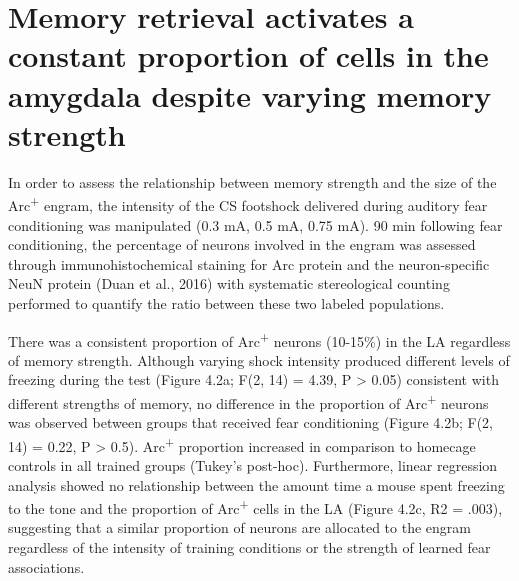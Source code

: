 \documentclass[12pt,a4paper,]{report}
\begin{document}
\section{Memory retrieval activates a constant proportion of cells in
the amygdala despite varying memory
strength}\label{memory-retrieval-activates-a-constant-proportion-of-cells-in-the-amygdala-despite-varying-memory-strength}

In order to assess the relationship between memory strength and the size
of the Arc\textsuperscript{+} engram, the intensity of the CS footshock
delivered during auditory fear conditioning was manipulated (0.3 mA, 0.5
mA, 0.75 mA). 90 min following fear conditioning, the percentage of
neurons involved in the engram was assessed through immunohistochemical
staining for Arc protein and the neuron-specific NeuN protein (Duan et
al., 2016) with systematic stereological counting performed to quantify
the ratio between these two labeled populations.

There was a consistent proportion of Arc\textsuperscript{+} neurons
(10-15\%) in the LA regardless of memory strength. Although varying
shock intensity produced different levels of freezing during the test
(Figure 4.2a; F(2, 14) = 4.39, P \textgreater{} 0.05) consistent with
different strengths of memory, no difference in the proportion of
Arc\textsuperscript{+} neurons was observed between groups that received
fear conditioning (Figure 4.2b; F(2, 14) = 0.22, P \textgreater{} 0.5).
Arc\textsuperscript{+} proportion increased in comparison to homecage
controls in all trained groups (Tukey's post-hoc). Furthermore, linear
regression analysis showed no relationship between the amount time a
mouse spent freezing to the tone and the proportion of
Arc\textsuperscript{+} cells in the LA (Figure 4.2c, R2 = .003),
suggesting that a similar proportion of neurons are allocated to the
engram regardless of the intensity of training conditions or the
strength of learned fear associations.
\end{document}
